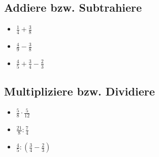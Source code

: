 \documentclass[12pt, arial]{article}
\begin{document}
        	\subsection{Addiere bzw. Subtrahiere}
         		\begin{itemize}
         			\item[] $\frac{1}{4} + \frac{3}{8}$
         			\item[] $\frac{4}{9} - \frac{3}{8}$
         			\item[] $\frac{4}{5} + \frac{3}{4} - \frac{2}{3}$
         		\end{itemize}
         	\subsection{Multipliziere bzw. Dividiere}
         		\begin{itemize}
         			\item[] $\frac{5}{8} \cdot \frac{5}{12}$
         			\item[] $\frac{21}{8} : \frac{7}{4}$
         			\item[] $\frac{4}{5} : (\frac{3}{4} - \frac{2}{3})$
         		\end{itemize}
\end{document}
